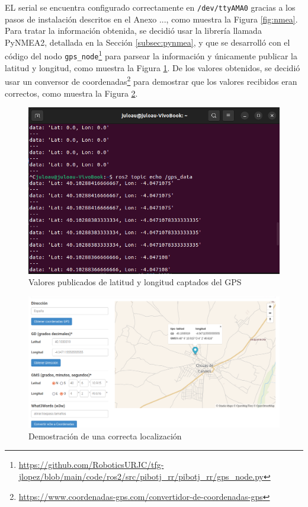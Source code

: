 EL serial se encuentra configurado correctamente en \verb|/dev/ttyAMA0| gracias a los pasos de instalación descritos en el Anexo ..., como muestra la Figura \ref{fig:nmea}. Para tratar la información obtenida, se decidió usar la librería llamada PyNMEA2, detallada en la Sección \ref{subsec:pynmea}, y que se desarrolló con el código del nodo \verb|gps_node|\footnote{\url{https://github.com/RoboticsURJC/tfg-jlopez/blob/main/code/ros2/src/pibotj_rr/pibotj_rr/gps_node.py}} para parsear la información y únicamente publicar la latitud y longitud, como muestra la Figura \ref{fig:gpsnode}. De los valores obtenidos, se decidió usar un conversor de coordenadas\footnote{\url{https://www.coordenadas-gps.com/convertidor-de-coordenadas-gps}} para demostrar que los valores recibidos eran correctos, como muestra la Figura \ref{fig:demogpsnode}.


 \begin{figure} [h!]
	\begin{center}
		\includegraphics[width=12cm]{figs/cap6/echo_gps_controller.png}
	\end{center}
	\caption{Valores publicados de latitud y longitud captados del GPS}
	\label{fig:gpsnode}
\end{figure}


 \begin{figure} [h!]
	\begin{center}
		\includegraphics[width=15cm]{figs/cap6/localizacion.png}
	\end{center}
	\caption{Demostración de una correcta localización}
	\label{fig:demogpsnode}
\end{figure}

